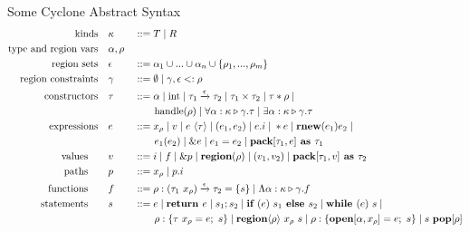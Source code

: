 \documentclass[aspectratio=169]{beamer}
\begin{document}
\begin{frame}{Some Cyclone Abstract Syntax}
\scriptsize{
\begin{alignat*}{2}
\text{kinds}\quad &\kappa &&::= T \altm R
\\
\text{type and region vars}\quad &\alpha,\rho &&
\\
\text{region sets}\quad &\epsilon &&::= \alpha_1 \cup ... \cup \alpha_n \cup \{\rho_1,...,\rho_m\}
\\
\text{region constraints} \quad &\gamma &&::= \emptyset \altm \gamma, \epsilon <: \rho
\\
\text{constructors} \quad &\tau &&::= \alpha \altm \text{int} \altm \tau_1 \xrightarrow[]{\epsilon} \tau_2 \altm \tau_1 \times \tau_2 \altm \tau \ast \rho \altm
\\
~ & ~ && \qquad \text{handle}(\rho) \altm \forall\alpha:\kappa \triangleright \gamma.\tau \altm \exists \alpha:\kappa \triangleright \gamma.\tau
\\
\text{expressions} \quad &e &&::= x_\rho \altm v \altm e\ \langle\tau\rangle \altm (e_1,e_2) \altm e.i \altm \ast e \altm \textbf{rnew}(e_1)e_2 \altm
\\
~ & ~ && \qquad e_1(e_2) \altm \&e \altm e_1 = e_2 \altm \textbf{pack} [\tau_1, e]\textbf{ as } \tau_1
\\
\text{values} \qquad &v &&::= i \altm f \altm \&p \altm \textbf{region}(\rho) \altm (v_1, v_2) \altm \textbf{pack}[\tau_1,v]\textbf{ as } \tau_2
\\
\text{paths} \qquad &p &&::= x_\rho \altm p.i
\\
\text{functions} \qquad &f &&::= \rho:(\tau_1\ x_{\rho}) \xrightarrow[]{\epsilon} \tau_2 = \{s\} \altm \Lambda\alpha:\kappa \triangleright \gamma.f
\\
\text{statements} \qquad &s &&::= e \altm \textbf{return } e \altm s_1;s_2 \altm \textbf{if } (e)\ s_1 \textbf{ else } s_2 \altm \textbf{while } (e)\ s \altm
\\
~ & ~ && \qquad \rho:\{\tau\ x_\rho = e;\ s\} \altm \textbf{region}\langle\rho\rangle\ x_{\rho}\ s \altm \rho:\{\textbf{open}[\alpha,x_{\rho}] = e;\ s\} \altm s\ \textbf{pop}[\rho]
\end{alignat*}
    }
\end{frame}
\end{document}
